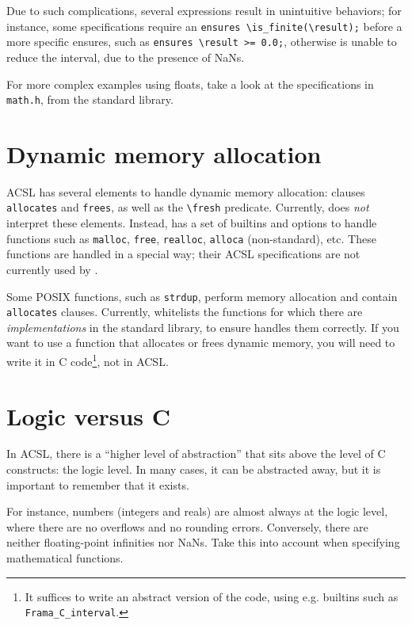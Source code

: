 \documentclass{frama-c-book}
\begin{document}
Due to such complications, several expressions result in unintuitive behaviors;
for instance, some specifications require an
\verb+ensures \is_finite(\result);+ before a more specific ensures, such as
\verb+ensures \result >= 0.0;+, otherwise \Eva{} is unable to reduce the interval,
due to the presence of NaNs.

For more complex examples using floats, take a look at the specifications in
\texttt{math.h}, from the \FramaC standard library.

\section{Dynamic memory allocation}

ACSL has several elements to handle dynamic memory allocation: clauses
\verb+allocates+ and \verb+frees+, as well as the \verb+\fresh+ predicate.
Currently, \Eva{} does {\em not} interpret these elements. Instead, \Eva{} has a set
of builtins and options to handle functions such as \texttt{malloc},
\texttt{free}, \texttt{realloc}, \texttt{alloca} (non-standard), etc.
These functions are handled in a special way; their ACSL specifications are not
currently used by \Eva{}.

Some POSIX functions, such as \texttt{strdup}, perform memory allocation and
contain \texttt{allocates} clauses. Currently, \Eva{} whitelists the functions
for which there are {\em implementations} in the \FramaC standard library,
to ensure \Eva{} handles them correctly. If you want to use a function that
allocates or frees dynamic memory, you will need to write it in C
code\footnote{It suffices to write an abstract version of the code, using
e.g. \FramaC builtins such as \texttt{Frama\_C\_interval}.}, not in ACSL.

\section{Logic versus C}
\label{sec:acsl-guide-logic}

In ACSL, there is a ``higher level of abstraction'' that sits above the level
of C constructs: the logic level. In many cases, it can be abstracted away,
but it is important to remember that it exists.

For instance, numbers (integers and reals) are almost always at the logic
level, where there are no overflows and no rounding errors. Conversely,
there are neither floating-point infinities nor NaNs. Take this into account
when specifying mathematical functions.
\end{document}
